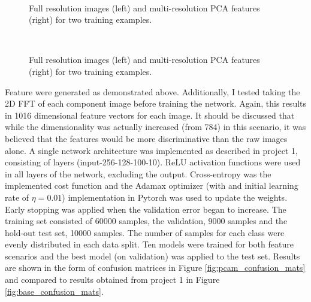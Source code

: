 \documentclass{article}[12 pt]
\begin{document}
\begin{figure}[!h]
	\centering
	\quad
	\\
	\quad
	\caption{Full resolution images (left) and multi-resolution PCA features (right) for two training examples.}
	\label{fig:sub2}
\end{figure}

\begin{figure}[!h]
	\centering
	\quad
	\\
	\quad
	\caption{Full resolution images (left) and multi-resolution PCA features (right) for two training examples.}
	\label{fig:sub3}
\end{figure}

\noindent
Feature were generated as demonstrated above.  Additionally, I tested taking the 2D FFT of each component image before training the network.  Again, this results in 1016 dimensional  feature vectors for each image.  It should be discussed that while the dimensionality was actually increased (from 784) in this scenario, it was believed that the features would be more discriminative than the raw images alone.  A single network architecture was implemented as described in project 1, consisting of layers (input-256-128-100-10). ReLU activation functions were used in all layers of the network, excluding the output.  Cross-entropy was the implemented cost function and the Adamax optimizer (with and initial learning rate of $\eta=0.01$) implementation in Pytorch was used to update the weights.  Early stopping was applied when the validation error began to increase.  The training set consisted of 60000 samples, the validation, 9000 samples and the hold-out test set, 10000 samples.  The number of samples for each class were evenly distributed in each data split.  Ten models were trained for both feature scenarios and the best model (on validation) was applied to the test set.  Results are shown in the form of confusion matrices in Figure \ref{fig:pcam_confusion_mats} and compared to results obtained from project 1 in Figure \ref{fig:base_confusion_mats}. 
\end{document}
